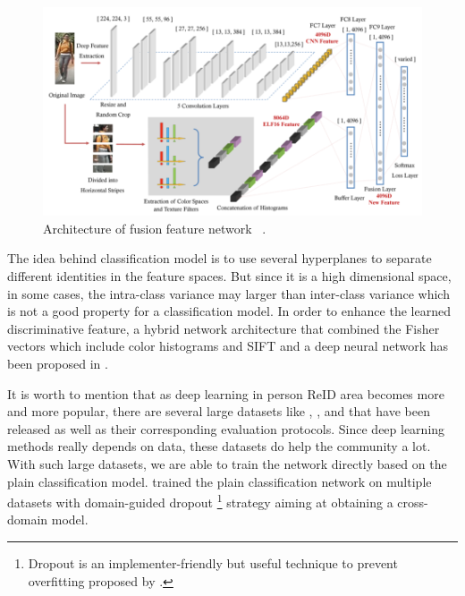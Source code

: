 \begin{figure}
    \includegraphics[width=\linewidth]{figures/ffn.png}
    \caption{
        Architecture of fusion feature network 
        ~\protect\cite{feature-fusion-net-2016}.
    }
    \label{fig:ffn}
\end{figure}

The idea behind classification model is to use several 
hyperplanes to separate different identities in the feature spaces. But since 
it is a high dimensional space, in some cases, the intra-class variance may 
larger than inter-class variance which is not a good property for a 
classification model.
In order to enhance the learned discriminative feature,
a hybrid network architecture that combined 
the Fisher vectors which include color histograms and SIFT and a deep 
neural network has been proposed in \cite{hybrid-net-lda-2016}.

It is worth to mention that as deep learning in person ReID area becomes more 
and more popular, there are several large datasets like
\cite{dataset-cuhk03-2014}, \cite{dataset-market1501-2015}, 
\cite{dataset-dukemtmc-2016} and \cite{dataset-cuhk03-np-2017} that have been 
released as well as their corresponding evaluation protocols.
Since deep learning methods really depends on data, these datasets do help the 
community a lot. With such large datasets, we are able to train the 
network directly based on the plain classification model. 
\cite{generic-deep-feature-for-reid-2016} trained the plain classification
network on multiple datasets with domain-guided dropout \footnote{Dropout is an 
implementer-friendly but useful technique  to prevent overfitting proposed
by \cite{dropout-paper-2014}.} strategy aiming at 
obtaining a cross-domain model. 


